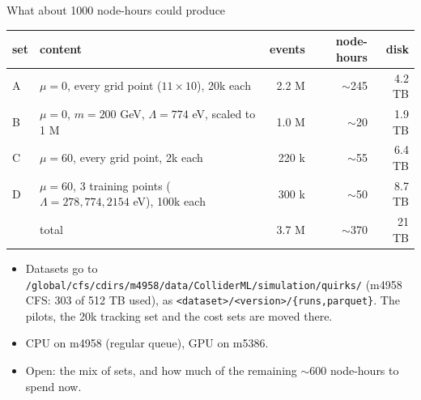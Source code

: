 \documentclass[aspectratio=169,10pt]{beamer}
\begin{document}
\begin{frame}{What about 1000 node-hours could produce}
\footnotesize
\centering
\begin{tabular}{llrrr}
\toprule
set & content & events & node-hours & disk \\
\midrule
A & $\mu = 0$, every grid point ($11 \times 10$), 20k each & 2.2 M & $\sim$245 & 4.2 TB \\
B & $\mu = 0$, $m = 200$ GeV, $\Lambda = 774$ eV, scaled to 1 M & 1.0 M & $\sim$20 & 1.9 TB \\
C & $\mu = 60$, every grid point, 2k each & 220 k & $\sim$55 & 6.4 TB \\
D & $\mu = 60$, 3 training points ($\Lambda = 278, 774, 2154$ eV), 100k each & 300 k & $\sim$50 & 8.7 TB \\
\midrule
 & total & 3.7 M & $\sim$370 & 21 TB \\
\bottomrule
\end{tabular}

\vspace{1em}
\raggedright
\begin{itemize}
\item Datasets go to \texttt{/global/cfs/cdirs/m4958/data/ColliderML/simulation/quirks/} (m4958 CFS: 303 of 512 TB used), as \texttt{<dataset>/<version>/\{runs,parquet\}}. The pilots, the 20k tracking set and the cost sets are moved there.
\item CPU on m4958 (regular queue), GPU on m5386.
\item Open: the mix of sets, and how much of the remaining $\sim$600 node-hours to spend now.
\end{itemize}
\end{frame}
\end{document}
